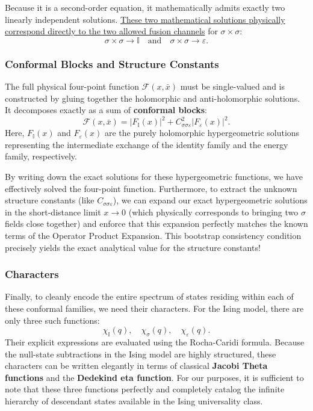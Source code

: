 Because it is a second-order equation, it mathematically admits exactly two linearly independent solutions. \uline{These two mathematical solutions physically correspond directly to the two allowed fusion channels} for \(\sigma \times \sigma\):
\[
    \sigma \times \sigma \to \mathbb{I} \quad \text{and} \quad \sigma \times \sigma \to \varepsilon.
\]

\subsubsection{Conformal Blocks and Structure Constants}

The full physical four-point function \(\mathcal{F}(x, \bar{x})\) must be single-valued and is constructed by gluing together the holomorphic and anti-holomorphic solutions. It decomposes exactly as a sum of \textbf{conformal blocks}:
\[
    \mathcal{F}(x, \bar{x}) = |F_{\mathbb{I}}(x)|^2 + C_{\sigma\sigma\varepsilon}^2 |F_{\varepsilon}(x)|^2.
\]
Here, \(F_{\mathbb{I}}(x)\) and \(F_{\varepsilon}(x)\) are the purely holomorphic hypergeometric solutions representing the intermediate exchange of the identity family and the energy family, respectively.

By writing down the exact solutions for these hypergeometric functions, we have effectively solved the four-point function. Furthermore, to extract the unknown structure constants (like \(C_{\sigma\sigma\varepsilon}\)), we can expand our exact hypergeometric solutions in the short-distance limit \(x \to 0\) (which physically corresponds to bringing two \(\sigma\) fields close together) and enforce that this expansion perfectly matches the known terms of the Operator Product Expansion. This bootstrap consistency condition precisely yields the exact analytical value for the structure constants!

\subsubsection{Characters}

Finally, to cleanly encode the entire spectrum of states residing within each of these conformal families, we need their characters. For the Ising model, there are only three such functions:
\[
    \chi_{\mathbb{I}}(q), \quad \chi_\sigma(q), \quad \chi_\varepsilon(q).
\]
Their explicit expressions are evaluated using the Rocha-Caridi formula. Because the null-state subtractions in the Ising model are highly structured, these characters can be written elegantly in terms of classical \textbf{Jacobi Theta functions} and the \textbf{Dedekind eta function}. For our purposes, it is sufficient to note that these three functions perfectly and completely catalog the infinite hierarchy of descendant states available in the Ising universality class.